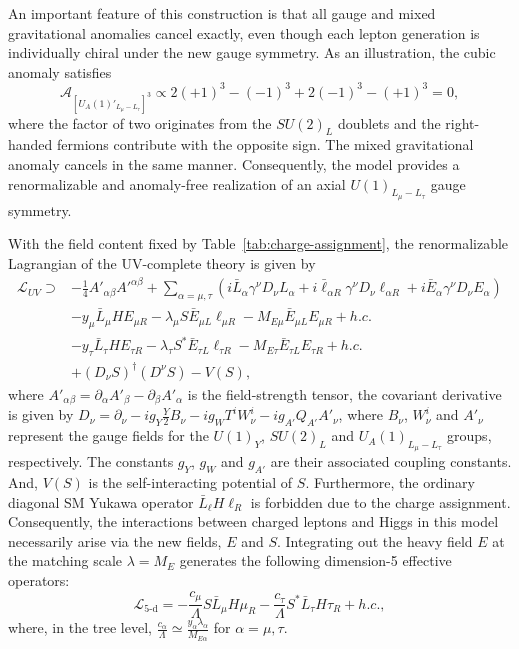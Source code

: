 \documentclass[onecolumn, aps, nofootinbib, prd, preprint, floats, floatfix, amsmath, amssymb, superscriptaddress, preprintnumbers]{revtex4-2}
\begin{document}
An important feature of this construction is that all gauge and mixed gravitational anomalies cancel exactly, even though each lepton generation is individually chiral under the new gauge symmetry. As an illustration, the cubic anomaly satisfies \cite{Ismail:2016tod}
\begin{equation}
\mathcal{A}_{[U_A(1)'_{L_\mu-L_\tau}]^3}
\propto
2(+1)^3
-(-1)^3
+2(-1)^3
-(+1)^3
=0,
\end{equation}
where the factor of two originates from the $SU(2)_L$ doublets and the right-handed fermions contribute with the opposite sign. The mixed gravitational anomaly cancels in the same manner. Consequently, the model provides a renormalizable and anomaly-free realization of an axial $U(1)_{L_\mu-L_\tau}$ gauge symmetry.



With the field content fixed by Table~\ref{tab:charge-assignment}, the renormalizable Lagrangian of the UV-complete theory is given by
\begin{equation}\label{eq:Lagrangian}
\begin{aligned}
\mathcal{L}_{UV}\supset& -\frac{1}{4}A'_{\alpha\beta}A'^{\alpha\beta}+\sum_{\alpha=\mu,\tau}\left(i\bar{L}_\alpha \gamma^\nu D_{\nu} L_\alpha + i\bar{\ell}_{\alpha R} \gamma^\nu D_{\nu}\ell_{\alpha R} + i\bar{E}_{\alpha}\gamma^\nu D_{\nu} E_{\alpha}\right)  \\
& -y_\mu \bar L_\mu H E_{\mu R} -\lambda_\mu S \bar E_{\mu L}\ell_{\mu R} -M_{E\mu}\bar E_{\mu L}E_{\mu R} + h.c.\\
&-y_\tau \bar L_\tau H E_{\tau R} -\lambda_\tau S^{*}\bar E_{\tau L}\ell_{\tau R} -M_{E\tau}\bar E_{\tau L}E_{\tau R} + h.c.\\
&+ (D_{\nu}S)^\dagger (D^{\nu}S) - V(S),
\end{aligned}
\end{equation}
where $A'_{\alpha\beta}=\partial_\alpha A'_\beta - \partial_\beta A'_\alpha$ is the field-strength tensor, the covariant derivative is given by $D_\nu = \partial_\nu -ig_Y \frac{Y}{2}B_\nu  -ig_W T^iW_\nu^i - ig_{A'} Q_{A'} A'_\nu$, where $B_\nu$, $W_\nu^i$ and $A'_\nu$ represent the gauge fields for the ${U(1)}_Y$, ${SU(2)}_L$ and ${U_A(1)}_{L_\mu-L_\tau}$ groups, respectively. The constants $g_Y$, $g_W$ and $g_{A'}$ are their associated coupling constants. And, $V(S)$ is the self-interacting potential of $S$. Furthermore, the ordinary diagonal SM Yukawa operator $\bar L_\ell H\ell_R$ is forbidden due to the charge assignment. Consequently, the interactions between charged leptons and Higgs in this model necessarily arise via the new fields, $E$ and $S$. Integrating out the heavy field $E$ at the matching scale $\lambda=M_E$ generates the following dimension-5 effective operators:
\begin{equation}\label{eq:5-d}
    \mathcal{L}_{\text{5-d}} =
    -\frac{c_\mu}{\Lambda} S \bar{L}_\mu H\mu_R
    -\frac{c_\tau}{\Lambda} S^* \bar{L}_\tau H\tau_R
    +h.c.,
\end{equation}
where, in the tree level, $\frac{c_\alpha}{\Lambda}\simeq \frac{y_\alpha \lambda_\alpha}{M_{E\alpha }}$ for $\alpha=\mu,\tau$.
\end{document}
